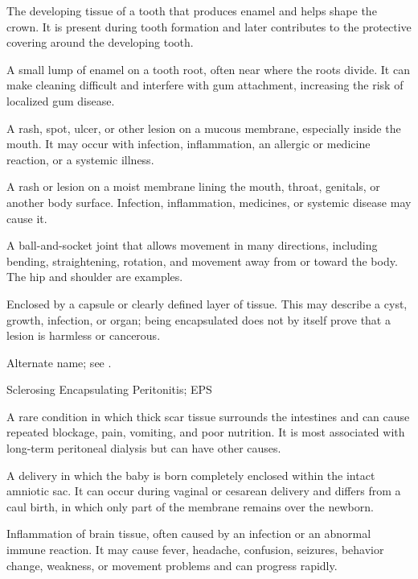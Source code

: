  The developing tissue of a tooth that produces enamel and helps shape the crown. It is present during tooth formation and later contributes to the protective covering around the developing tooth.

 A small lump of enamel on a tooth root, often near where the roots divide. It can make cleaning difficult and interfere with gum attachment, increasing the risk of localized gum disease.

 A rash, spot, ulcer, or other lesion on a mucous membrane, especially inside the mouth. It may occur with infection, inflammation, an allergic or medicine reaction, or a systemic illness.

 A rash or lesion on a moist membrane lining the mouth, throat, genitals, or another body surface. Infection, inflammation, medicines, or systemic disease may cause it.

 A ball-and-socket joint that allows movement in many directions, including bending, straightening, rotation, and movement away from or toward the body. The hip and shoulder are examples.

 Enclosed by a capsule or clearly defined layer of tissue. This may describe a cyst, growth, infection, or organ; being encapsulated does not by itself prove that a lesion is harmless or cancerous.

 Alternate name; see .

\synonyms
Sclerosing Encapsulating Peritonitis; EPS

 A rare condition in which thick scar tissue surrounds the intestines and can cause repeated blockage, pain, vomiting, and poor nutrition. It is most associated with long-term peritoneal dialysis but can have other causes.

 A delivery in which the baby is born completely enclosed within the intact amniotic sac. It can occur during vaginal or cesarean delivery and differs from a caul birth, in which only part of the membrane remains over the newborn.

 Inflammation of brain tissue, often caused by an infection or an abnormal immune reaction. It may cause fever, headache, confusion, seizures, behavior change, weakness, or movement problems and can progress rapidly.

